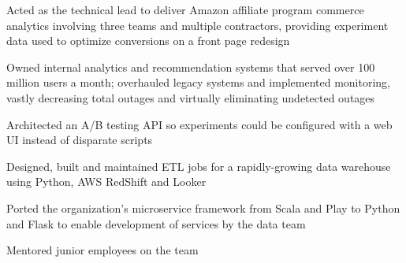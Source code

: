 \begin{job}

  \begin{accomplishments}
    \item Acted as the technical lead to deliver Amazon affiliate program
    commerce analytics involving three teams and multiple contractors, providing
    experiment data used to optimize conversions on a front page redesign
    \item Owned internal analytics and recommendation systems that served over
    100 million users a month; overhauled legacy systems and implemented
    monitoring, vastly decreasing total outages and virtually eliminating
    undetected outages
  \end{accomplishments}

  \begin{extendedaccomplishments}
    \item Architected an A/B testing API so experiments could be configured with
    a web UI instead of disparate scripts
    \item Designed, built and maintained ETL jobs for a rapidly-growing data
    warehouse using Python, AWS RedShift and Looker
    \item Ported the organization's microservice framework from Scala and Play
    to Python and Flask to enable development of services by the data team
    \item Mentored junior employees on the team
  \end{extendedaccomplishments}
\end{job}
